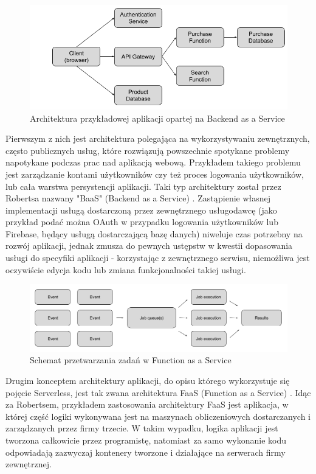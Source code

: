 \documentclass[oneside]{mgr}
\begin{document}
\begin{figure}
	\centering
	\includegraphics[width=15cm]{2017-04-1010:44:19}
	\caption{Architektura przykładowej aplikacji opartej na Backend as a Service \cite{martinFowlerServerless}}
	\label{fig:schematArchitekturyBaaS}
\end{figure}


Pierwszym z nich jest architektura polegająca na wykorzystywaniu zewnętrznych, często publicznych usług, które rozwiązują powszechnie spotykane problemy napotykane podczas prac nad aplikacją webową. Przykładem takiego problemu jest zarządzanie kontami użytkowników czy też proces logowania użytkowników, lub cała warstwa persystencji aplikacji. Taki typ architektury został przez Robertsa nazwany "BaaS" (Backend as a Service) \cite{martinFowlerServerless}. Zastąpienie własnej implementacji usługą dostarczoną przez zewnętrznego usługodawcę (jako przykład podać można OAuth w przypadku logowania użytkowników lub Firebase, będący usługą dostarczającą bazę danych) niweluje czas potrzebny na rozwój aplikacji, jednak zmusza do pewnych ustępstw w kwestii dopasowania usługi do specyfiki aplikacji - korzystając z zewnętrznego serwisu, niemożliwa jest oczywiście edycja kodu lub zmiana funkcjonalności takiej usługi.

\begin{figure}
	\centering
	\includegraphics[width=15cm]{1-Qv681cjXguRg-H1XyLcxXw}
	\caption{Schemat przetwarzania zadań w Function as a Service \cite{kenFrommThinkingServerless}}
	\label{fig:schematDzialaniaFaaS}
\end{figure}

Drugim konceptem architektury aplikacji, do opisu którego wykorzystuje się pojęcie Serverless, jest tak zwana architektura FaaS (Function as a Service) \cite{martinFowlerServerless}. Idąc za Robertsem, przykładem zastosowania architektury FaaS jest aplikacja, w której część logiki wykonywana jest na maszynach obliczeniowych dostarczanych i zarządzanych przez firmy trzecie. W takim wypadku, logika aplikacji jest tworzona całkowicie przez programistę, natomiast za samo wykonanie kodu odpowiadają zazwyczaj kontenery tworzone i działające na serwerach firmy zewnętrznej.
\end{document}
